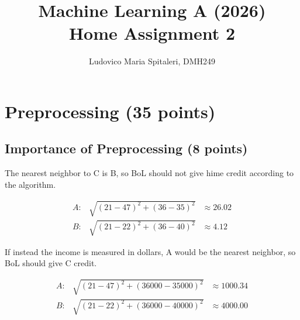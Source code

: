 \documentclass[a4paper,12pt]{article}
\begin{document}
\title{Machine Learning A (2026)\\Home Assignment 2}
\author{\color{red}Ludovico Maria Spitaleri, DMH249}
\date{}
\maketitle

\tableofcontents %
\newpage %






\section{Preprocessing (35 points)}

\subsection{Importance of Preprocessing (8 points)}

The nearest neighbor to C is B, so BoL should not give hime credit according to
the algorithm.

$$
\begin{aligned}
A: & \sqrt{(21-47)^2 + (36-35)^2} & \approx 26.02 \\
B: & \sqrt{(21-22)^2 + (36-40)^2} & \approx 4.12
\end{aligned}
$$

If instead the income is measured in dollars, A would be the nearest
neighbor, so BoL should give C credit.

$$
\begin{aligned}
A: & \sqrt{(21-47)^2 + (36000 - 35000)^2} & \approx 1000.34 \\
B: & \sqrt{(21-22)^2 + (36000 - 40000)^2} & \approx 4000.00
\end{aligned}
$$
\end{document}
